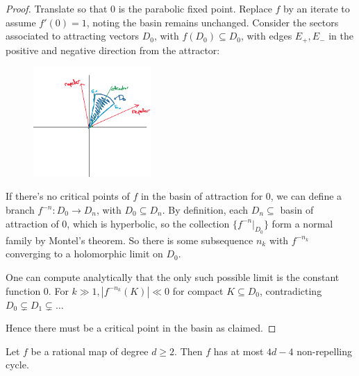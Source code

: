 \documentclass[10pt,a4paper]{article}
\begin{document}
\begin{proof}
  Translate so that $0$ is the parabolic fixed point. Replace $f$ by an iterate to assume $f'(0) = 1$, noting the basin remains unchanged. Consider the sectors associated to attracting vectors $D_0$, with $f(D_0)\subseteq D_0$, with edges $E_+, E_-$ in the positive and negative direction from the attractor:
  \begin{figure}[H]
    \centering
    \vspace*{-13pt}
    \includegraphics[width=0.4\textwidth]{compdyn07.png}
  \end{figure}
  If there's no critical points of $f$ in the basin of attraction for  $0$, we can define a branch $f^{-n} : D_0 \to D_n$, with $D_0 \subseteq D_n$. By definition, each $D_n \subseteq$ basin of attraction of $0$, which is hyperbolic, so the collection $\{f^{-n}|_{D_0}\}$ form a normal family by Montel's theorem. So there is some subsequence $n_k$ with $f^{-n_k}$ converging to a holomorphic limit on $D_0$.

  One can compute analytically that the only such possible limit is the constant function 0. For $k \gg 1, |f^{-n_k}(K)|\ll 0$ for compact $K \subseteq D_0$, contradicting $D_0 \subsetneq D_1 \subsetneq \ldots$

  Hence there must be a critical point in the basin as claimed.
\end{proof}
\begin{corollary}
  Let $f$ be a rational map of degree $d \geq 2$. Then $f$ has at most $4d-4$ non-repelling cycle.
\end{corollary}
\end{document}
